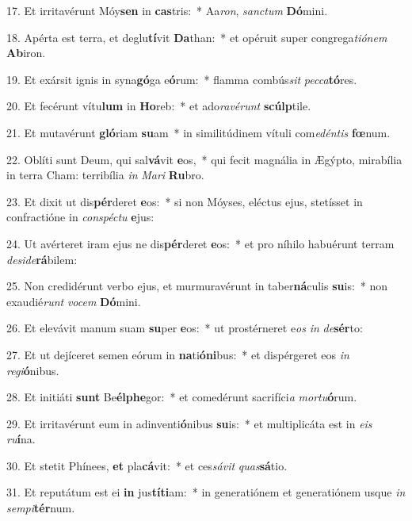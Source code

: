 17. Et irritavérunt Móy\textbf{sen} in \textbf{cas}tris:~*  Aa\textit{ron}, \textit{sanc}\textit{tum} \textbf{Dó}mini.\

18. Apérta est terra, et deglu\textbf{tí}vit \textbf{Da}than:~*  et opéruit super congrega\textit{ti}\textit{ó}\textit{nem} \textbf{Ab}iron.\

19. Et exársit ignis in syna\textbf{gó}ga e\textbf{ó}rum:~*  flamma combús\textit{sit} \textit{pec}\textit{ca}\textbf{tó}res.\

20. Et fecérunt vítu\textbf{lum} in \textbf{Ho}reb:~*  et ado\textit{ra}\textit{vé}\textit{runt} \textbf{scúlp}tile.\

21. Et mutavérunt \textbf{gló}riam \textbf{su}am~*  in similitúdinem vítuli com\textit{e}\textit{dén}\textit{tis} \textbf{fœ}num.\

22. Oblíti sunt Deum, qui sal\textbf{vá}vit \textbf{e}os,~*  qui fecit magnália in Ægýpto, mirabília in terra Cham: terribília \textit{in} \textit{Ma}\textit{ri} \textbf{Ru}bro.\

23. Et dixit ut dis\textbf{pér}deret \textbf{e}os:~*  si non Móyses, eléctus ejus, stetísset in confractióne in \textit{con}\textit{spéc}\textit{tu} \textbf{e}jus:\

24. Ut avérteret iram ejus ne dis\textbf{pér}deret \textbf{e}os:~*  et pro níhilo habuérunt terram \textit{de}\textit{si}\textit{de}\textbf{rá}bilem:\

25. Non credidérunt verbo ejus, et murmuravérunt in taber\textbf{ná}culis \textbf{su}is:~*  non exaudié\textit{runt} \textit{vo}\textit{cem} \textbf{Dó}mini.\

26. Et elevávit manum suam \textbf{su}per \textbf{e}os:~*  ut prostérneret e\textit{os} \textit{in} \textit{de}\textbf{sér}to:\

27. Et ut dejíceret semen eórum in \textbf{na}ti\textbf{ó}\textbf{ni}bus:~*  et dispérgeret eos \textit{in} \textit{re}\textit{gi}\textbf{ó}nibus.\

28. Et initiáti \textbf{sunt} Be\textbf{él}\textbf{phe}gor:~*  et comedérunt sacrifíci\textit{a} \textit{mor}\textit{tu}\textbf{ó}rum.\

29. Et irritavérunt eum in adinventi\textbf{ó}nibus \textbf{su}is:~*  et multiplicáta est in \textit{e}\textit{is} \textit{ru}\textbf{í}na.\

30. Et stetit Phínees, \textbf{et} pla\textbf{cá}vit:~*  et ces\textit{sá}\textit{vit} \textit{quas}\textbf{sá}tio.\

31. Et reputátum est ei \textbf{in} jus\textbf{tí}\textbf{ti}am:~*  in generatiónem et generatiónem usque \textit{in} \textit{sem}\textit{pi}\textbf{tér}num.\

